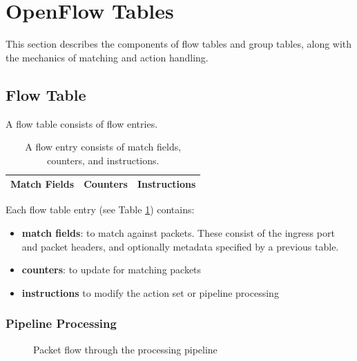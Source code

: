 \documentclass[10pt]{article}
\begin{document}
\section{OpenFlow Tables}
This section describes the components of flow tables and group tables, along with the mechanics of matching and action handling.

\subsection{Flow Table}
\label{ft:flowtableentry}

A flow table consists of flow entries.

\begin{table}[hbp]
\centering
\begin{tabular}{|c|c|c|}
\hline	
Match Fields & Counters & Instructions\\ 
\hline	
\end{tabular}
\caption{A flow entry consists of match fields, counters, and instructions.}
\label{table:flow entry}
\end{table}

Each flow table entry (see Table \ref{table:flow entry}) contains: 
\begin{itemize} 
\item \textbf{match fields}: to match against packets. These consist of the ingress port and packet headers, and optionally metadata specified by a previous table.
\item \textbf{counters}: to update for matching packets
\item \textbf{instructions} to modify the action set or pipeline processing
\end{itemize} 

\subsubsection{Pipeline Processing}
\label{sec:pipeline}

\begin{figure}[htbp]
\centering
{}
\caption{Packet flow through the processing pipeline}
\label{fig:packet flow multiple tables}
\end{figure}
\end{document}
